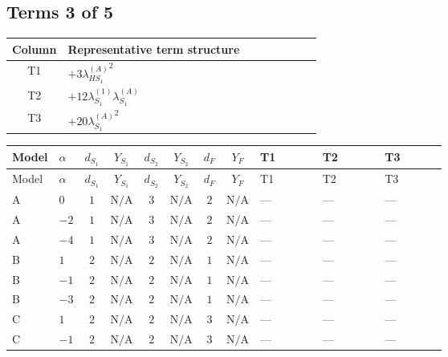 \documentclass[8pt]{article}
\begin{document}
\begin{landscape}
\subsection*{Terms 3 of 5}
\begin{center}
\begin{tabular}{@{}c >{\raggedright\arraybackslash}p{0.82\linewidth}@{}}
\toprule
Column & Representative term structure \\
\midrule
T1 & \(\displaystyle +3 {\lambda_{HS_1}^{(A)}}^2\) \\
\midrule
T2 & \(\displaystyle +12 {\lambda_{S_1}^{(1)}} {\lambda_{S_1}^{(A)}}\) \\
\midrule
T3 & \(\displaystyle +20 {\lambda_{S_1}^{(A)}}^2\) \\
\midrule
\bottomrule
\end{tabular}
\end{center}
\smallskip
\tiny
\begin{longtable}{@{}llcccccc >{\raggedright\arraybackslash}p{0.21\linewidth} >{\raggedright\arraybackslash}p{0.21\linewidth} >{\raggedright\arraybackslash}p{0.21\linewidth}@{}}
\toprule
Model & $\alpha$ & $d_{S_1}$ & $Y_{S_1}$ & $d_{S_2}$ & $Y_{S_2}$ & $d_F$ & $Y_F$ & T1 & T2 & T3 \\
\midrule
\endfirsthead
\toprule
Model & $\alpha$ & $d_{S_1}$ & $Y_{S_1}$ & $d_{S_2}$ & $Y_{S_2}$ & $d_F$ & $Y_F$ & T1 & T2 & T3 \\
\midrule
\endhead
A & $0$ & $1$ & $\text{N/A}$ & $3$ & $\text{N/A}$ & $2$ & $\text{N/A}$ & --- & --- & --- \\
\midrule
A & $-2$ & $1$ & $\text{N/A}$ & $3$ & $\text{N/A}$ & $2$ & $\text{N/A}$ & --- & --- & --- \\
\midrule
A & $-4$ & $1$ & $\text{N/A}$ & $3$ & $\text{N/A}$ & $2$ & $\text{N/A}$ & --- & --- & --- \\
\midrule
B & $1$ & $2$ & $\text{N/A}$ & $2$ & $\text{N/A}$ & $1$ & $\text{N/A}$ & --- & --- & --- \\
\midrule
B & $-1$ & $2$ & $\text{N/A}$ & $2$ & $\text{N/A}$ & $1$ & $\text{N/A}$ & --- & --- & --- \\
\midrule
B & $-3$ & $2$ & $\text{N/A}$ & $2$ & $\text{N/A}$ & $1$ & $\text{N/A}$ & --- & --- & --- \\
\midrule
C & $1$ & $2$ & $\text{N/A}$ & $2$ & $\text{N/A}$ & $3$ & $\text{N/A}$ & --- & --- & --- \\
\midrule
C & $-1$ & $2$ & $\text{N/A}$ & $2$ & $\text{N/A}$ & $3$ & $\text{N/A}$ & --- & --- & --- \\
\midrule

\end{longtable}
\end{landscape}
\end{document}
